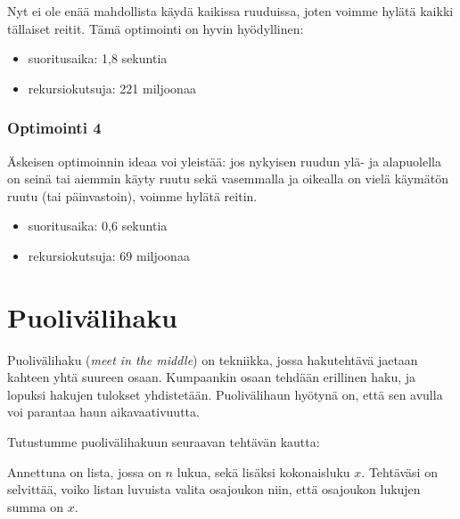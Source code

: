 \begin{center}
\end{center}

Nyt ei ole enää mahdollista käydä kaikissa ruuduissa,
joten voimme hylätä kaikki tällaiset reitit.
Tämä optimointi on hyvin hyödyllinen:

\begin{itemize}
\item
suoritusaika: 1{,}8 sekuntia
\item
rekursiokutsuja: 221 miljoonaa
\end{itemize}

\subsubsection{Optimointi 4}

Äskeisen optimoinnin ideaa voi yleistää:
jos nykyisen ruudun ylä- ja alapuolella on
seinä tai aiemmin käyty ruutu
sekä vasemmalla ja oikealla on
vielä käymätön ruutu (tai päinvastoin),
voimme hylätä reitin.

\begin{itemize}
\item
suoritusaika: 0{,}6 sekuntia
\item
rekursiokutsuja: 69 miljoonaa
\end{itemize}

\section{Puolivälihaku}

Puolivälihaku (\textit{meet in the middle})
on tekniikka,
jossa hakutehtävä jaetaan kahteen yhtä suureen osaan.
Kumpaankin osaan tehdään erillinen haku,
ja lopuksi hakujen tulokset yhdistetään.
Puolivälihaun hyötynä on, että sen avulla voi
parantaa haun aikavaativuutta.

Tutustumme puolivälihakuun seuraavan tehtävän kautta:

\begin{task}
Annettuna on lista, jossa on $n$ lukua,
sekä lisäksi kokonaisluku $x$.
Tehtäväsi on selvittää, voiko listan luvuista
valita osajoukon niin, että osajoukon lukujen summa on $x$.
\end{task}

